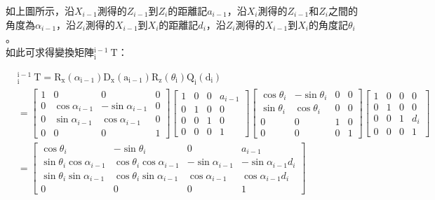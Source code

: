 \documentclass[class=NCU_thesis, crop=false]{standalone}
\begin{document}
如上圖所示，沿$X_{i-1}$測得的$Z_{i-1}$到$Z_{i}$的距離記$a_{i-1}$，沿$X_{i}$測得的$Z_{i-1}$和$Z_{i}$之間的角度為$\alpha_{i-1}$，沿$Z_{i}$測得的$X_{i-1}$到$X_{i}$的距離記$d_{i}$，沿$Z_{i}$測得的$X_{i-1}$到$X_{i}$的角度記$\theta_{i}$。\\
如此可求得變換矩陣${ }_{\mathrm{i}}^{\mathrm{i}-1} \mathrm{~T}$：

\begin{small}
\begin{align}
\nonumber
& { }_{\mathrm{i}}^{\mathrm{i}-1} \mathrm{~T}=\mathrm{R}_{\mathrm{x}}\left(\alpha_{\mathrm{i}-1}\right) \mathrm{D}_{\mathrm{x}}\left(\mathrm{a}_{\mathrm{i}-1}\right) \mathrm{R}_{\mathrm{z}}\left(\theta_{\mathrm{i}}\right) \mathrm{Q}_{\mathrm{i}}\left(\mathrm{d}_{\mathrm{i}}\right) \\
\nonumber
& =
\left[\begin{array}{cccc}
1 & 0 & 0 & 0 \\
0 & \cos \alpha_{i-1} & -\sin \alpha_{i-1} & 0 \\
0 & \sin \alpha_{i-1} & \cos \alpha_{i-1} & 0 \\
0 & 0 & 0 & 1
\end{array}\right]
\nonumber
\left[\begin{array}{cccc}
1 & 0 & 0 & a_{i-1} \\
0 & 1 & 0 & 0 \\
0 & 0 & 1 & 0 \\
0 & 0 & 0 & 1
\end{array}\right]
\nonumber
\left[\begin{array}{cccc}
\cos \theta_{i} & -\sin \theta_{i} & 0 & 0 \\
\sin \theta_{i} & \cos \theta_{i} & 0 & 0 \\
0 & 0 & 1 & 0\\
0 & 0 & 0 & 1
\end{array}\right]
\nonumber
\left[\begin{array}{cccc}
1 & 0 & 0 & 0 \\
0 & 1 & 0 & 0 \\
0 & 0 & 1 & d_{i} \\
0 & 0 & 0 & 1
\end{array}\right]\\
\nonumber
& =\left[\begin{array}{cccc}
\cos \theta_{i} & -\sin \theta_{i} & 0 & a_{i-1} \\
\sin \theta_{i} \cos \alpha_{i-1} & \cos \theta_{i} \cos \alpha_{i-1} & -\sin \alpha_{i-1} & -\sin \alpha_{i-1} d_{i} \\
\sin \theta_{i} \sin \alpha_{i-1} & \cos \theta_{i} \sin \alpha_{i-1} & \cos \alpha_{i-1} & \cos \alpha_{i-1} d_{i} \\
0 & 0 & 0 & 1
\end{array}\right] \\
\nonumber
&\end{align}
\end{small}
\end{document}
